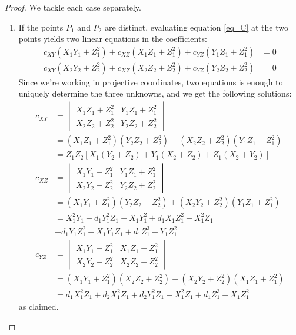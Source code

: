 \begin{proof}
We tackle each case separately.
\begin{enumerate}
\item
If the points $P_1$ and $P_2$ are distinct, evaluating equation \ref{eq_C} at
    the two points yields two linear equations in the coefficients:
\begin{align*}
c_{XY}(X_1Y_1 + Z_1^2) + c_{XZ}(X_1Z_1 + Z_1^2) + c_{YZ}(Y_1Z_1 + Z_1^2) &= 0\\
c_{XY}(X_2Y_2 + Z_2^2) + c_{XZ}(X_2Z_2 + Z_2^2) + c_{YZ}(Y_2Z_2 + Z_2^2) &= 0
\end{align*}
Since we're working in projective coordinates, two equations is enough to
    uniquely determine the three unknowns, and we get the following solutions:
\begin{align*}
c_{XY}
    &=  \begin{vmatrix}
        X_1Z_1 + Z_1^2  &   Y_1Z_1 + Z_1^2\\
        X_2Z_2 + Z_2^2  &   Y_2Z_2 + Z_2^2
        \end{vmatrix}\\
    &=  (X_1Z_1 + Z_1^2)(Y_2Z_2 + Z_2^2) + (X_2Z_2 + Z_2^2)(Y_1Z_1 + Z_1^2)\\
    &=  Z_1Z_2\left[X_1(Y_2 + Z_2) + Y_1(X_2 +Z_2) + Z_1(X_2 + Y_2)\right]\\
c_{XZ}
    &=  \begin{vmatrix}
        X_1Y_1 + Z_1^2  &   Y_1Z_1 + Z_1^2\\
        X_2Y_2 + Z_2^2  &   Y_2Z_2 + Z_2^2
        \end{vmatrix}\\
    &=  (X_1Y_1 + Z_1^2)(Y_2Z_2 + Z_2^2) + (X_2Y_2 + Z_2^2)(Y_1Z_1 + Z_1^2)\\
    &=  X_1^2Y_1 + d_1Y_1^2Z_1 + X_1Y_1^2 + d_1X_1Z_1^2 + X_1^2Z_1\\
    &+ d_1Y_1Z_1^2 + X_1Y_1Z_1 + d_1Z_1^3 + Y_1Z_1^2\\
c_{YZ}
    &=  \begin{vmatrix}
        X_1Y_1 + Z_1^2  &    X_1Z_1 + Z_1^2\\
        X_2Y_2 + Z_2^2  &    X_2Z_2 + Z_2^2
        \end{vmatrix}\\
    &=  (X_1Y_1 + Z_1^2)(X_2Z_2 + Z_2^2) + (X_2Y_2 + Z_2^2)(X_1Z_1 + Z_1^2)\\
    &=  d_1X_1^2Z_1 +d_2X_1^2Z_1 + d_2Y_1^2Z_1 + X_1^2Z_1 + d_1Z_1^3 + X_1Z_1^2
\end{align*}
    as claimed.


\end{enumerate}
\end{proof}
